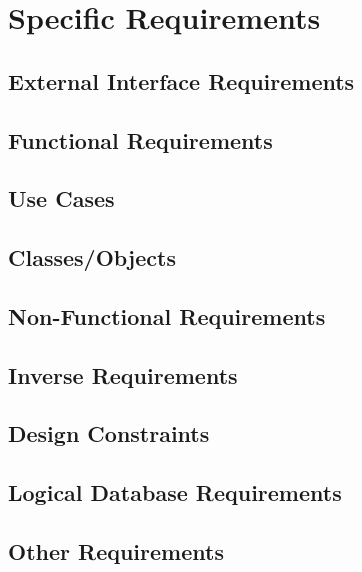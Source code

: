 
\section{Specific Requirements}

	\subsection{External Interface Requirements}
		

	\subsection{Functional Requirements}
		
		
		
		
		
		

	\subsection{Use Cases}
		

	\subsection{Classes/Objects}
		

	\subsection{Non-Functional Requirements}
		

	\subsection{Inverse Requirements}


	\subsection{Design Constraints}


	\subsection{Logical Database Requirements}


	\subsection{Other Requirements}